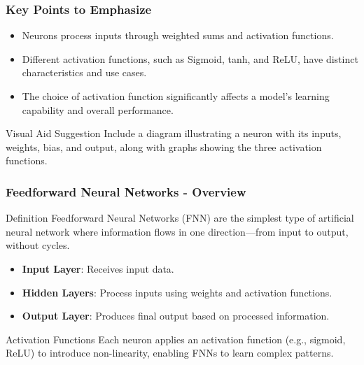 \documentclass[aspectratio=169]{beamer}
\begin{document}
\begin{frame}[fragile]
  \frametitle{Key Points to Emphasize}

  \begin{itemize}
    \item Neurons process inputs through weighted sums and activation functions.
    \item Different activation functions, such as Sigmoid, tanh, and ReLU, have distinct characteristics and use cases.
    \item The choice of activation function significantly affects a model's learning capability and overall performance.
  \end{itemize}

  \begin{block}{Visual Aid Suggestion}
    Include a diagram illustrating a neuron with its inputs, weights, bias, and output, along with graphs showing the three activation functions.
  \end{block}
\end{frame}

\begin{frame}[fragile]
    \frametitle{Feedforward Neural Networks - Overview}
    \begin{block}{Definition}
        Feedforward Neural Networks (FNN) are the simplest type of artificial neural network where information flows in one direction—from input to output, without cycles.
    \end{block}
    
    \begin{itemize}
        \item \textbf{Input Layer}: Receives input data.
        \item \textbf{Hidden Layers}: Process inputs using weights and activation functions.
        \item \textbf{Output Layer}: Produces final output based on processed information.
    \end{itemize}
    
    \begin{block}{Activation Functions}
        Each neuron applies an activation function (e.g., sigmoid, ReLU) to introduce non-linearity, enabling FNNs to learn complex patterns.
    \end{block}
\end{frame}
\end{document}
